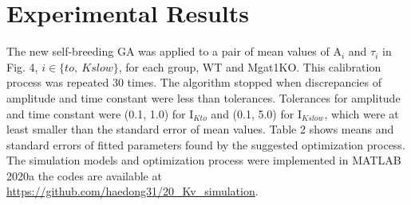 \documentclass[journal]{IEEEtran}
\begin{document}
\section{Experimental Results}
\begin{table}
    \caption{Fitted model parameters}
    \label{table2}
    \centering
\end{table}
The new self-breeding GA was applied to a pair of mean values of $\text{A}_i$ and $\tau_i$ in Fig. 4, $i \in \{to,\ Kslow\}$, for each group, WT and Mgat1KO. This calibration process was repeated 30 times. The algorithm stopped when discrepancies of amplitude and time constant were less than tolerances. Tolerances for amplitude and time constant were (0.1, 1.0) for $\text{I}_{Kto}$ and (0.1, 5.0) for $\text{I}_{Kslow}$, which were at least smaller than the standard error of mean values. Table 2 shows means and standard errors of fitted parameters found by the suggested optimization process. The simulation models and optimization process were implemented in MATLAB 2020a the codes are available at \url{https://github.com/haedong31/20_Kv_simulation}.
\end{document}
